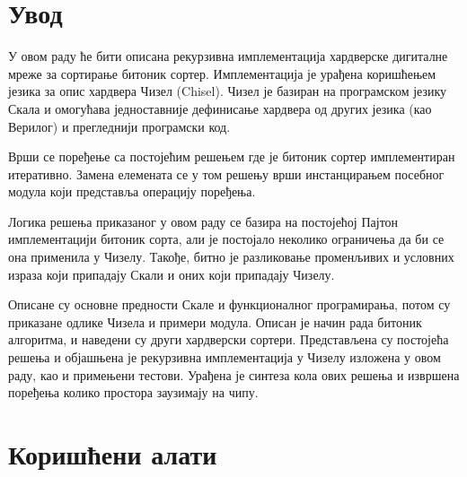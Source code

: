\documentclass[12pt, a4paper]{article}
\theoremstyle{definition}
\begin{document}
\tableofcontents
\newpage

\section{Увод}
У овом раду ће бити описана рекурзивна имплементација хардверске дигиталне мреже за сортирање битоник сортер. Имплементација је урађена коришћењем језика за опис хардвера Чизел (Chisel). Чизел је базиран на програмском језику Скала и омогућава једноставније дефинисање хардвера од других језика (као Верилог) и прегледнији програмски код.

Врши се поређење са постојећим решењем где је битоник сортер имплементиран итеративно. Замена елемената се у том решењу врши инстанцирањем посебног модула који представља операцију поређења.

Логика решења приказаног у овом раду се базира на постојећој Пајтон имплементацији битоник сорта, али је постојало неколико ограничења да би се она применила у Чизелу. Такође, битно је разликовање променљивих и условних израза који припадају Скали и оних који припадају Чизелу.

Описане су основне предности Скале и функционалног програмирања, потом су приказане одлике Чизела и примери модула. Описан је начин рада битоник алгоритма, и наведени су други хардверски сортери.
Представљена су постојећа решења и објашњена је рекурзивна имплементација у Чизелу изложена у овом раду, као и примењени тестови. Урађена је синтеза кола ових решења и извршена поређења колико простора заузимају на чипу.



\newpage

\section{Коришћени алати}
\end{document}
